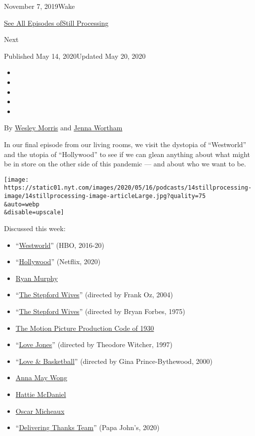 November 7, 2019Wake

\href{https://www.nytimes.com/column/still-processing-podcast}{See All
Episodes ofStill Processing}

Next

Published May 14, 2020Updated May 20, 2020

\begin{itemize}
\item
\item
\item
\item
\item
\end{itemize}

By \href{https://www.nytimes.com/by/wesley-morris}{Wesley Morris} and
\href{https://www.nytimes.com/by/jenna-wortham}{Jenna Wortham}

In our final episode from our living rooms, we visit the dystopia of
``Westworld'' and the utopia of ``Hollywood'' to see if we can glean
anything about what might be in store on the other side of this pandemic
--- and about who we want to be.

\texttt{[image: https://static01.nyt.com/images/2020/05/16/podcasts/14stillprocessing-image/14stillprocessing-image-articleLarge.jpg?quality=75\\\&auto=webp\\\&disable=upscale]}

Discussed this week:

\begin{itemize}
\item
  ``\href{https://www.hbo.com/westworld}{Westworld}'' (HBO, 2016-20)
\item
  ``\href{https://www.netflix.com/title/81088617}{Hollywood}'' (Netflix,
  2020)
\item
  \href{https://www.imdb.com/name/nm0614682/}{Ryan Murphy}
\item
  ``\href{https://www.imdb.com/title/tt0327162/}{The Stepford Wives}''
  (directed by Frank Oz, 2004)
\item
  ``\href{https://www.imdb.com/title/tt0073747/}{The Stepford Wives}''
  (directed by Bryan Forbes, 1975)
\item
  \href{https://www.asu.edu/courses/fms200s/total-readings/MotionPictureProductionCode.pdf}{The
  Motion Picture Production Code of 1930}
\item
  ``\href{https://www.imdb.com/title/tt0119572/}{Love Jones}'' (directed
  by Theodore Witcher, 1997)
\item
  ``\href{https://www.imdb.com/title/tt0199725/}{Love \& Basketball}''
  (directed by Gina Prince-Bythewood, 2000)
\item
  \href{https://www.imdb.com/name/nm0938923/}{Anna May Wong}
\item
  \href{https://www.imdb.com/name/nm0567408/}{Hattie McDaniel}
\item
  \href{https://www.imdb.com/name/nm0584778/}{Oscar Micheaux}
\item
  ``\href{https://www.youtube.com/watch?v=mczJdKcB1bc}{Delivering Thanks
  Team}'' (Papa John's, 2020)
\end{itemize}


